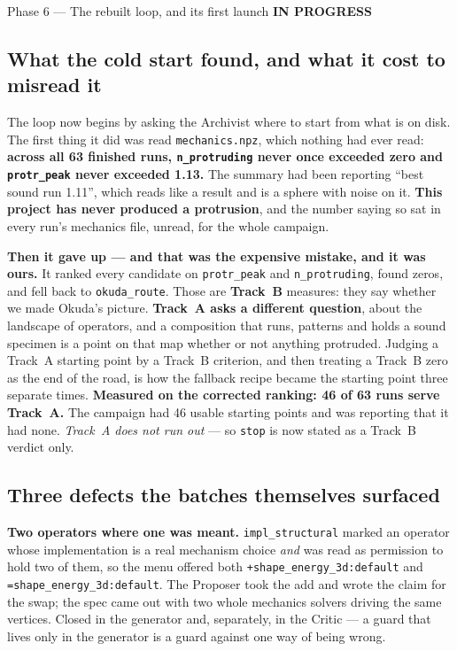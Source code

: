 \documentclass[11pt,a4paper]{article}
\newcommand{\code}[1]{\texttt{#1}}
\newcommand{\prog}{\textcolor{warn}{\textbf{IN PROGRESS}}}
\begin{document}
\begin{phasebox}{Phase 6 --- The rebuilt loop, and its first launch \hfill \prog}
\subsection*{What the cold start found, and what it cost to misread it}

The loop now begins by asking the Archivist where to start from what is on disk. The first thing
it did was read \code{mechanics.npz}, which nothing had ever read: \textbf{across all 63 finished
runs, \code{n\_protruding} never once exceeded zero and \code{protr\_peak} never exceeded 1.13.}
The summary had been reporting ``best sound run 1.11'', which reads like a result and is a sphere
with noise on it. \textbf{This project has never produced a protrusion}, and the number saying so
sat in every run's mechanics file, unread, for the whole campaign.

\textbf{Then it gave up --- and that was the expensive mistake, and it was ours.} It ranked every
candidate on \code{protr\_peak} and \code{n\_protruding}, found zeros, and fell back to
\code{okuda\_route}. Those are \textbf{Track~B} measures: they say whether we made Okuda's picture.
\textbf{Track~A asks a different question}, about the landscape of operators, and a composition
that runs, patterns and holds a sound specimen is a point on that map whether or not anything
protruded. Judging a Track~A starting point by a Track~B criterion, and then treating a Track~B
zero as the end of the road, is how the fallback recipe became the starting point three separate
times. \textbf{Measured on the corrected ranking: 46 of 63 runs serve Track~A.} The campaign had
46 usable starting points and was reporting that it had none. \emph{Track~A does not run out} ---
so \code{stop} is now stated as a Track~B verdict only.

\subsection*{Three defects the batches themselves surfaced}

\textbf{Two operators where one was meant.} \code{impl\_structural} marked an operator whose
implementation is a real mechanism choice \emph{and} was read as permission to hold two of them,
so the menu offered both \code{+shape\_energy\_3d:default} and \code{=shape\_energy\_3d:default}.
The Proposer took the add and wrote the claim for the swap; the spec came out with two whole
mechanics solvers driving the same vertices. Closed in the generator and, separately, in the
Critic --- a guard that lives only in the generator is a guard against one way of being wrong.


\end{phasebox}
\end{document}
